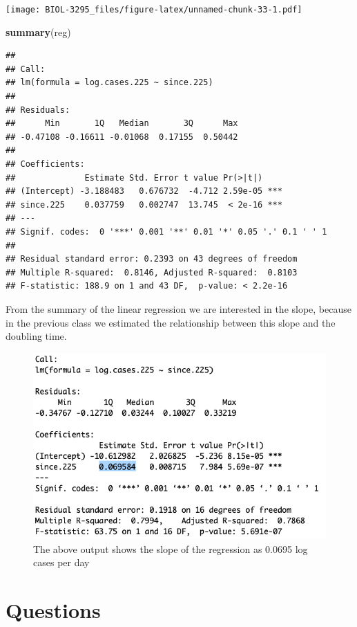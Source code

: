 \documentclass[]{book}
\newenvironment{Shaded}{\begin{snugshade}}{\end{snugshade}}
\newcommand{\KeywordTok}[1]{\textcolor[rgb]{0.13,0.29,0.53}{\textbf{{#1}}}}
\newcommand{\NormalTok}[1]{{#1}}
\begin{document}
\texttt{[image: BIOL-3295\_files/figure-latex/unnamed-chunk-33-1.pdf]}

\begin{Shaded}
\begin{Highlighting}[]
\KeywordTok{summary}\NormalTok{(reg)}
\end{Highlighting}
\end{Shaded}

\begin{verbatim}
## 
## Call:
## lm(formula = log.cases.225 ~ since.225)
## 
## Residuals:
##      Min       1Q   Median       3Q      Max 
## -0.47108 -0.16611 -0.01068  0.17155  0.50442 
## 
## Coefficients:
##              Estimate Std. Error t value Pr(>|t|)    
## (Intercept) -3.188483   0.676732  -4.712 2.59e-05 ***
## since.225    0.037759   0.002747  13.745  < 2e-16 ***
## ---
## Signif. codes:  0 '***' 0.001 '**' 0.01 '*' 0.05 '.' 0.1 ' ' 1
## 
## Residual standard error: 0.2393 on 43 degrees of freedom
## Multiple R-squared:  0.8146, Adjusted R-squared:  0.8103 
## F-statistic: 188.9 on 1 and 43 DF,  p-value: < 2.2e-16
\end{verbatim}

From the summary of the linear regression we are interested in the
slope, because in the previous class we estimated the relationship
between this slope and the doubling time.

\begin{figure}
\includegraphics[width=0.95\linewidth]{figures/regression} \caption{The above output shows the slope of the regression as 0.0695 log cases per day}\label{fig:regression}
\end{figure}

\section{Questions}\label{questions}
\end{document}

